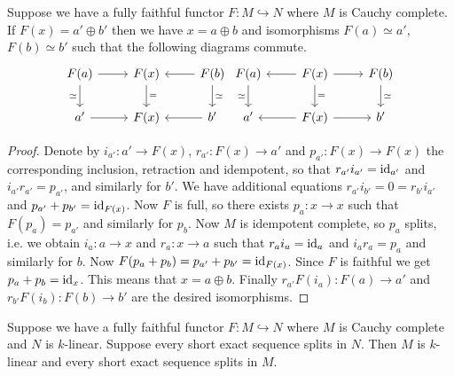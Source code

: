  \begin{lemma}\label{direct_sum}

 Suppose we have a fully faithful functor $F:M\hookrightarrow N$ where $M$ is Cauchy complete. If $F(x)=a'\oplus b'$ then we have $x=a\oplus b$ and isomorphisms $F(a)\simeq a'$, $F(b)\simeq b'$ such that the following diagrams commute.
\[\begin{tikzcd}
	{F(a)} & {F(x)} & {F(b)} \\
	{a'} & {F(x)} & {b'}
	\arrow[from=1-1, to=1-2]
	\arrow["\simeq"', from=1-1, to=2-1]
	\arrow["{=}", from=1-2, to=2-2]
	\arrow[from=1-3, to=1-2]
	\arrow["\simeq", from=1-3, to=2-3]
	\arrow[from=2-1, to=2-2]
	\arrow[from=2-3, to=2-2]
\end{tikzcd} \begin{tikzcd}
	{F(a)} & {F(x)} & {F(b)} \\
	{a'} & {F(x)} & {b'}
	\arrow["\simeq"', from=1-1, to=2-1]
	\arrow[from=1-2, to=1-1]
	\arrow[from=1-2, to=1-3]
	\arrow["{=}", from=1-2, to=2-2]
	\arrow["\simeq", from=1-3, to=2-3]
	\arrow[from=2-2, to=2-1]
	\arrow[from=2-2, to=2-3]
\end{tikzcd}\] \end{lemma}


 \begin{proof} Denote by $i_{a'}:a'\to F(x)$, $r_{a'}:F(x)\to a'$ and $p_{a'}:F(x)\to F(x)$ the corresponding inclusion, retraction and idempotent, so that $r_{a'}i_{a'}=\operatorname{id}_{a'}$ and $i_{a'} r_{a'}=p_{a'}$, and similarly for $b'$. We have additional equations $r_{a'}i_{b'}=0=r_{b'}i_{a'}$ and $p_{a'}+p_{b'}=\operatorname{id}_{F(x)}$.  Now $F$ is full, so there exists $p_a:x\to x$ such that $F(p_a)=p_{a'}$ and similarly for $p_b$. Now $M$ is idempotent complete, so $p_a$ splits, i.e. we obtain $i_a:a\to x$ and $r_a:x\to a$ such that $r_a i_a=\operatorname{id}_a$ and $i_a r_a=p_a$ and similarly for $b$. Now $F(p_a+p_b)=p_{a'}+p_{b'}=\operatorname{id}_{F(x)}$. Since $F$ is faithful we get $p_a+p_b=\operatorname{id}_x$. This means that $x=a\oplus b$. Finally $r_{a'}F(i_a):F(a)\to a'$ and $r_{b'}F(i_b):F(b)\to b'$ are the desired isomorphisms.\end{proof}


 \begin{lemma}\label{abelian}
Suppose we have a fully faithful functor $F:M\hookrightarrow N$ where $M$ is Cauchy complete and $N$ is $k$-linear. Suppose every short exact sequence splits in $N$.  Then $M$ is $k$-linear and every short exact sequence splits in $M$.\end{lemma}

